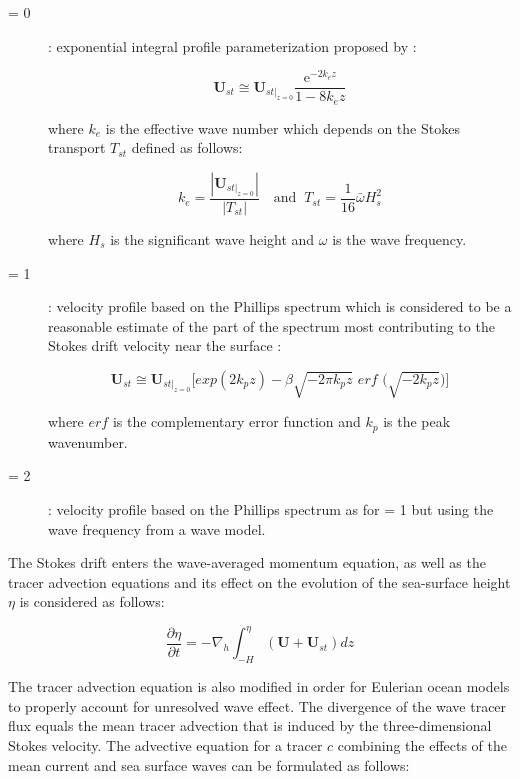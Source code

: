 \documentclass[../main/NEMO_manual]{subfiles}
\begin{document}
\begin{description}
\item[ = 0]: exponential integral profile parameterization proposed by 
\citet{Breivik_al_JPO2014}:

\[
  \mathbf{U}_{st} \cong \mathbf{U}_{st |_{z=0}} \frac{\mathrm{e}^{-2k_ez}} {1-8k_ez} 
\]

where $k_e$ is the effective wave number which depends on the Stokes transport $T_{st}$ defined as follows:

\[
  k_e = \frac{|\mathbf{U}_{\left.st\right|_{z=0}}|} {|T_{st}|}
  \quad \text{and }\
  T_{st} = \frac{1}{16} \bar{\omega} H_s^2 
\]

where $H_s$ is the significant wave height and $\omega$ is the wave frequency.

\item[ = 1]: velocity profile based on the Phillips spectrum which is considered to be a 
reasonable estimate of the part of the spectrum most contributing to the Stokes drift velocity near the surface
\citep{Breivik_al_OM2016}:

\[
  \mathbf{U}_{st} \cong \mathbf{U}_{st |_{z=0}} \Big[exp(2k_pz)-\beta \sqrt{-2 \pi k_pz}
  \textit{ erf } \Big(\sqrt{-2 k_pz}\Big)\Big]
\]

where $erf$ is the complementary error function and $k_p$ is the peak wavenumber.

\item[ = 2]: velocity profile based on the Phillips spectrum as for  = 1 
but using the wave frequency from a wave model.

\end{description}

The Stokes drift enters the wave-averaged momentum equation, as well as the tracer advection equations 
and its effect on the evolution of the sea-surface height ${\eta}$ is considered as follows: 

\[
  \frac{\partial{\eta}}{\partial{t}} =
  -\nabla_h \int_{-H}^{\eta} (\mathbf{U} + \mathbf{U}_{st}) dz
\]

The tracer advection equation is also modified in order for Eulerian ocean models to properly account 
for unresolved wave effect. The divergence of the wave tracer flux equals the mean tracer advection 
that is induced by the three-dimensional Stokes velocity. 
The advective equation for a tracer $c$ combining the effects of the mean current and sea surface waves 
can be formulated as follows: 
\end{document}
